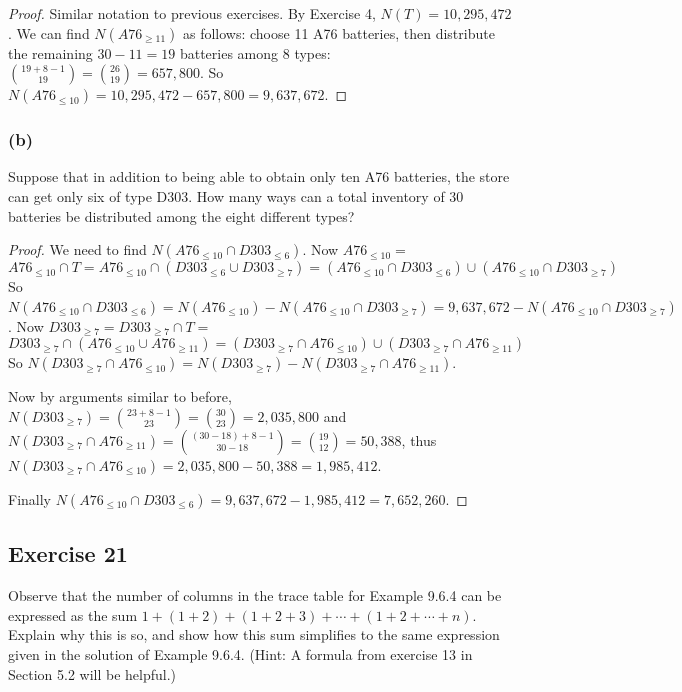 \documentclass[14pt]{extarticle}
\begin{document}
\begin{proof}
Similar notation to previous exercises. By Exercise 4, \(N(T) = 10,295,472\). We can find \(N(A76_{\geq 11})\) as follows:
choose 11 A76 batteries, then distribute the remaining \(30-11=19\) batteries among 8 types: \(\binom{19+8-1}{19} = 
\binom{26}{19} = 657,800\). So \(N(A76_{\leq 10}) = 10,295,472 - 657,800 = 9,637,672\).
\end{proof}

\subsubsection{(b)}
Suppose that in addition to being able to obtain only ten A76 batteries, the store can get only six of type D303. How many 
ways can a total inventory of 30 batteries be distributed among the eight different types?

\begin{proof}
We need to find \(N(A76_{\leq 10} \cap D303_{\leq 6})\). Now \(A76_{\leq 10} = \)
\[
A76_{\leq 10} \cap T = A76_{\leq 10} \cap (D303_{\leq 6} \cup D303_{\geq 7}) = (A76_{\leq 10} \cap 
D303_{\leq 6}) \cup (A76_{\leq 10} \cap D303_{\geq 7})
\]
So \(N(A76_{\leq 10} \cap D303_{\leq 6}) = N(A76_{\leq 10}) - N(A76_{\leq 10} \cap D303_{\geq 7}) = 9,637,672 - 
N(A76_{\leq 10} \cap D303_{\geq 7})\). Now \(D303_{\geq 7} = D303_{\geq 7} \cap T = \)
\[
D303_{\geq 7} \cap (A76_{\leq 10} \cup A76_{\geq 11}) = (D303_{\geq 7} \cap A76_{\leq 10}) \cup (D303_{\geq 7} \cap 
A76_{\geq 11})
\]
So \(N(D303_{\geq 7} \cap A76_{\leq 10}) = N(D303_{\geq 7}) - N(D303_{\geq 7} \cap A76_{\geq 11})\). 

Now by arguments similar to before, \(N(D303_{\geq 7}) = \binom{23+8-1}{23} = \binom{30}{23} = 2,035,800\) and 
\(N(D303_{\geq 7} \cap A76_{\geq 11}) = \binom{(30-18)+8-1}{30-18} = \binom{19}{12} = 50,388\), thus \(N(D303_{\geq 7} 
\cap A76_{\leq 10}) = 2,035,800 - 50,388 = 1,985,412\).

Finally \(N(A76_{\leq 10} \cap D303_{\leq 6}) = 9,637,672 - 
1,985,412 = 7,652,260\).
\end{proof}

\subsection{Exercise 21}
Observe that the number of columns in the trace table for Example 9.6.4 can be expressed as the sum \(1 + (1 + 2) + (1 + 
2 + 3) + \cdots + (1 + 2 + \cdots + n)\). Explain why this is so, and show how this sum simplifies to the same expression 
given in the solution of Example 9.6.4. (Hint: A formula from exercise 13 in Section 5.2 will be helpful.)
\end{document}
